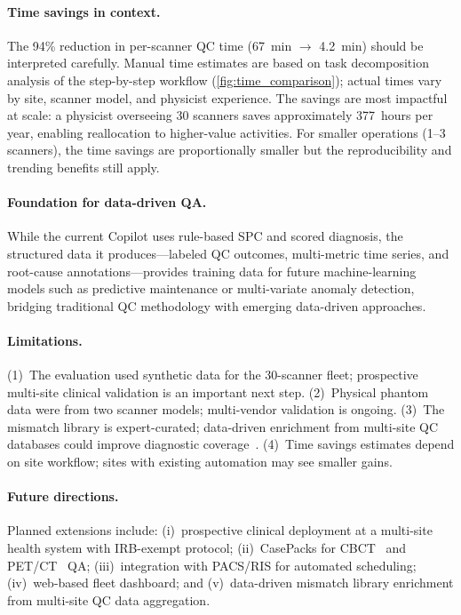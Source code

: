 \documentclass[11pt]{article}
\begin{document}
\paragraph{Time savings in context.}
The 94\% reduction in per-scanner QC time (67~min $\to$ 4.2~min)
should be interpreted carefully.
Manual time estimates are based on task decomposition analysis
of the step-by-step workflow (\cref{fig:time_comparison}); actual
times vary by site, scanner model, and physicist experience.
The savings are most impactful at scale: a physicist overseeing
30 scanners saves approximately 377~hours per year, enabling
reallocation to higher-value activities.
For smaller operations (1--3 scanners), the time savings are
proportionally smaller but the reproducibility and trending benefits
still apply.

\paragraph{Foundation for data-driven QA.}
While the current Copilot uses rule-based SPC and scored diagnosis,
the structured data it produces---labeled QC outcomes, multi-metric
time series, and root-cause annotations---provides training data
for future machine-learning models such as predictive maintenance
or multi-variate anomaly detection, bridging traditional QC
methodology with emerging data-driven approaches.

\paragraph{Limitations.}
(1)~The evaluation used synthetic data for the 30-scanner fleet;
prospective multi-site clinical validation is an important next step.
(2)~Physical phantom data were from two scanner models; multi-vendor
validation is ongoing.
(3)~The mismatch library is expert-curated; data-driven enrichment
from multi-site QC databases could improve diagnostic
coverage~\cite{mccollough2004ct_performance}.
(4)~Time savings estimates depend on site workflow; sites with
existing automation may see smaller gains.

\paragraph{Future directions.}
Planned extensions include: (i)~prospective clinical deployment at
a multi-site health system with IRB-exempt protocol; (ii)~CasePacks
for CBCT~\cite{bissonnette2008cbct} and PET/CT~\cite{aapm_tg126}
QA; (iii)~integration with PACS/RIS for automated scheduling;
(iv)~web-based fleet dashboard; and (v)~data-driven mismatch library
enrichment from multi-site QC data aggregation.
\end{document}
